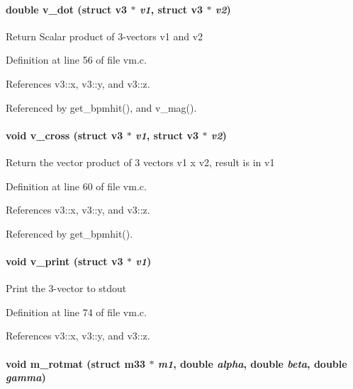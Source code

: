 \paragraph[v\_\-dot]{\setlength{\rightskip}{0pt plus 5cm}double v\_\-dot (struct {\bf v3} $\ast$ {\em v1}, \/  struct {\bf v3} $\ast$ {\em v2})}\hfill\label{group__orbit_gaab575d66a39e7cb15f9d6bada3681f8}


Return Scalar product of 3-vectors v1 and v2 

Definition at line 56 of file vm.c.

References v3::x, v3::y, and v3::z.

Referenced by get\_\-bpmhit(), and v\_\-mag().
\paragraph[v\_\-cross]{\setlength{\rightskip}{0pt plus 5cm}void v\_\-cross (struct {\bf v3} $\ast$ {\em v1}, \/  struct {\bf v3} $\ast$ {\em v2})}\hfill\label{group__orbit_gddc6a06d3b3a2cdb76c87b293f3da57e}


Return the vector product of 3 vectors v1 x v2, result is in v1 

Definition at line 60 of file vm.c.

References v3::x, v3::y, and v3::z.

Referenced by get\_\-bpmhit().
\paragraph[v\_\-print]{\setlength{\rightskip}{0pt plus 5cm}void v\_\-print (struct {\bf v3} $\ast$ {\em v1})}\hfill\label{group__orbit_g5c483baf2b96daffe1c12c39ba306443}


Print the 3-vector to stdout 

Definition at line 74 of file vm.c.

References v3::x, v3::y, and v3::z.
\paragraph[m\_\-rotmat]{\setlength{\rightskip}{0pt plus 5cm}void m\_\-rotmat (struct {\bf m33} $\ast$ {\em m1}, \/  double {\em alpha}, \/  double {\em beta}, \/  double {\em gamma})}\hfill\label{group__orbit_gf6919d2e8076c7414dfbbcf292b77596}


